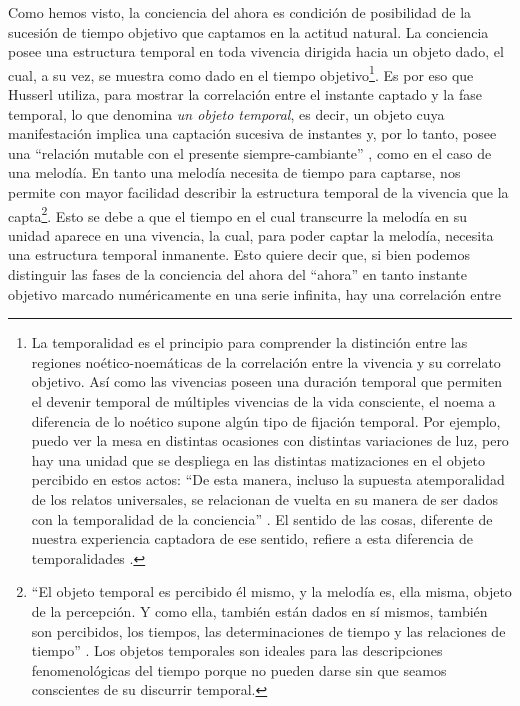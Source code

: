 Como hemos visto, la conciencia del ahora es condición de posibilidad de
la sucesión de tiempo objetivo que captamos en la actitud natural. La
conciencia posee una estructura temporal en toda vivencia dirigida hacia
un objeto dado, el cual, a su vez, se muestra como dado en el tiempo
objetivo\footnote{La temporalidad es el principio para comprender la
  distinción entre las regiones noético-noemáticas de la correlación
  entre la vivencia y su correlato objetivo. Así como las vivencias
  poseen una duración temporal que permiten el devenir temporal de
  múltiples vivencias de la vida consciente, el noema a diferencia de lo
  noético supone algún tipo de fijación temporal. Por ejemplo, puedo ver
  la mesa en distintas ocasiones con distintas variaciones de luz, pero
  hay una unidad que se despliega en las distintas matizaciones en el
  objeto percibido en estos actos: ``De esta manera, incluso la supuesta
  atemporalidad de los relatos universales, se relacionan de vuelta en
  su manera de ser dados con la temporalidad de la conciencia'' \cite[p.~47]{held2003}. El sentido de las cosas, diferente de nuestra experiencia
  captadora de ese sentido, refiere a esta diferencia de temporalidades
  \cite[§45, p.~116]{husserl2002}.}. Es por eso que Husserl utiliza, para
mostrar la correlación entre el instante captado y la fase temporal, lo
que denomina \emph{un objeto temporal}, es decir, un objeto cuya
manifestación implica una captación sucesiva de instantes y, por lo
tanto, posee una ``relación mutable con el presente siempre-cambiante''
\cite[p.~94]{smith2003}, como en el caso de una melodía. En tanto una melodía
necesita de tiempo para captarse, nos permite con mayor facilidad
describir la estructura temporal de la vivencia que la capta\footnote{``El
  objeto temporal es percibido él mismo, y la melodía es, ella misma,
  objeto de la percepción. Y como ella, también están dados en sí
  mismos, también son percibidos, los tiempos, las determinaciones de
  tiempo y las relaciones de tiempo'' \cite[§14, p.~58]{husserl2002}. Los
  objetos temporales son ideales para las descripciones fenomenológicas
  del tiempo porque no pueden darse sin que seamos conscientes de su
  discurrir temporal.}. Esto se debe a que el tiempo en el cual
transcurre la melodía en su unidad aparece en una vivencia, la cual,
para poder captar la melodía, necesita una estructura temporal
inmanente. Esto quiere decir que, si bien podemos distinguir las fases
de la conciencia del ahora del ``ahora'' en tanto instante objetivo
marcado numéricamente en una serie infinita, hay una correlación entre
